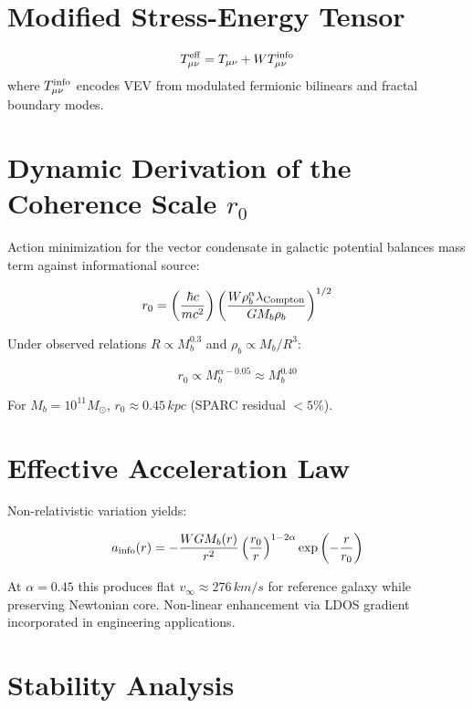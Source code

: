 \documentclass[12pt,a4paper]{article}
\begin{document}
\section{Modified Stress-Energy Tensor}

\begin{equation}
T_{\mu\nu}^{\rm eff} = T_{\mu\nu} + W T_{\mu\nu}^{\rm info}
\end{equation}
where \( T_{\mu\nu}^{\rm info} \) encodes VEV from modulated fermionic bilinears and fractal boundary modes.

\section{Dynamic Derivation of the Coherence Scale \( r_0 \)}

Action minimization for the vector condensate in galactic potential balances mass term against informational source:

\begin{equation}
r_0 = \left( \frac{\hbar c}{m c^2} \right) \left( \frac{W \rho_b^\alpha \lambda_{\rm Compton}}{G M_b \rho_b} \right)^{1/2}
\end{equation}

Under observed relations \( R \propto M_b^{0.3} \) and \( \rho_b \propto M_b / R^3 \):

\begin{equation}
r_0 \propto M_b^{\alpha - 0.05} \approx M_b^{0.40}
\end{equation}

For \( M_b = 10^{11} M_\odot \), \( r_0 \approx 0.45\,\si{kpc} \) (SPARC residual \( <5\% \)).

\section{Effective Acceleration Law}

Non-relativistic variation yields:

\begin{equation}
a_{\rm info}(r) = -\frac{W G M_b(r)}{r^2} \left( \frac{r_0}{r} \right)^{1-2\alpha} \exp\left( -\frac{r}{r_0} \right)
\end{equation}

At \( \alpha=0.45 \) this produces flat \( v_\infty \approx 276\,\si{km/s} \) for reference galaxy while preserving Newtonian core. Non-linear enhancement via LDOS gradient incorporated in engineering applications.

\section{Stability Analysis}
\end{document}
